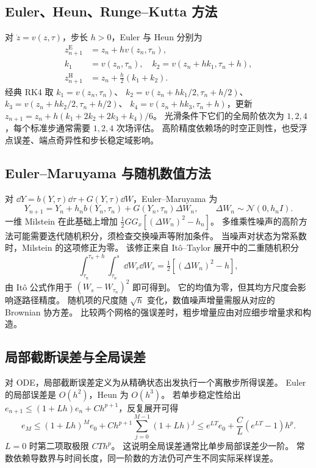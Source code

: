 \subsection{Euler、Heun、Runge--Kutta 方法}

对 \(\dot z=v(z,\tau)\)，步长 \(h>0\)，Euler 与 Heun 分别为
\begin{equation}
 \begin{aligned}
 z_{n+1}^{\mathrm E}&=z_n+h v(z_n,\tau_n),\\
 k_1&=v(z_n,\tau_n),\quad k_2=v(z_n+h k_1,\tau_n+h),\\
 z_{n+1}^{\mathrm H}&=z_n+\tfrac h2(k_1+k_2).
 \end{aligned}
 \label{eq:generation-euler-heun}
\end{equation}
经典 RK4 取 \(k_1=v(z_n,\tau_n)\)、
\(k_2=v(z_n+h k_1/2,\tau_n+h/2)\)、
\(k_3=v(z_n+h k_2/2,\tau_n+h/2)\)、
\(k_4=v(z_n+h k_3,\tau_n+h)\)，更新
\(z_{n+1}=z_n+h(k_1+2k_2+2k_3+k_4)/6\)。
光滑条件下它们的全局阶依次为 \(1,2,4\)，每个标准步通常需要 \(1,2,4\) 次场评估。
高阶精度依赖场的时空正则性，也受浮点误差、端点奇异性和步长稳定域影响。

\subsection{Euler--Maruyama 与随机数值方法}

对 \(\dd Y=b(Y,\tau)\dd\tau+G(Y,\tau)\dd W\)，Euler--Maruyama 为
\begin{equation}
 Y_{n+1}=Y_n+h_n b(Y_n,\tau_n)+G(Y_n,\tau_n)\Delta W_n,
 \qquad\Delta W_n\sim\mathcal N(0,h_nI).
 \label{eq:generation-em}
\end{equation}
一维 Milstein 在此基础上增加
\(\frac12 GG_x[(\Delta W_n)^2-h_n]\)。
多维乘性噪声的高阶方法可能需要迭代随机积分，须检查交换噪声等附加条件。
当噪声对状态为常系数时，Milstein 的这项修正为零。
该修正来自 It\^o--Taylor 展开中的二重随机积分
\[
 \int_{\tau_n}^{\tau_n+h}\int_{\tau_n}^{s}\dd W_r\dd W_s
 =\tfrac12[(\Delta W_n)^2-h],
\]
由 It\^o 公式作用于 \((W_s-W_{\tau_n})^2\) 即可得到。
它的均值为零，但其均方尺度会影响逐路径精度。
随机项的尺度随 \(\sqrt h\) 变化，数值噪声增量需服从对应的 Brownian 协方差。
比较两个网格的强误差时，粗步增量应由对应细步增量求和构造。

\subsection{局部截断误差与全局误差}

对 ODE，局部截断误差定义为从精确状态出发执行一个离散步所得误差。
Euler 的局部误差是 \(O(h^2)\)，Heun 为 \(O(h^3)\)。
若单步稳定性给出
\(e_{n+1}\le(1+Lh)e_n+Ch^{p+1}\)，反复展开可得
\[
 e_M\le (1+Lh)^M e_0+Ch^{p+1}\sum_{j=0}^{M-1}(1+Lh)^j
 \le e^{LT}e_0+\frac C L(e^{LT}-1)h^p.
\]
\(L=0\) 时第二项取极限 \(CT h^p\)。
这说明全局误差通常比单步局部误差少一阶。
常数依赖导数界与时间长度，同一阶数的方法仍可产生不同实际采样误差。

